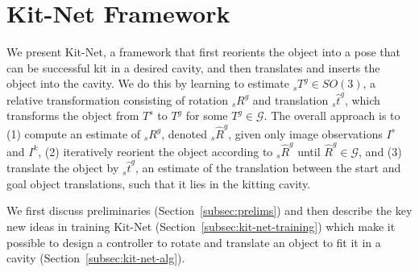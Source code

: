 \section{Kit-Net Framework}
\label{sec:method}
We present Kit-Net, a framework that first reorients the object into a pose that can be successful kit in a desired cavity, and then translates and inserts the object into the cavity. We do this by learning to estimate ${_s}T^g \in SO(3)$, a relative transformation consisting of rotation ${_s}R^g$ and translation ${_s}\hat{t}^g$, which transforms the object from $T^s$ to $T^g$ for some $T^g \in \mathcal{G}$. The overall approach is to (1) compute an estimate of ${_s}R^g$, denoted ${_s}\hat{R}^g$, given only image observations $I^s$ and $I^k$, (2) iteratively reorient the object according to  ${_s}\hat{R}^g$ until $\hat{R}^g \in \mathcal{G}$, and (3) translate the object by ${_s}\hat{t}^g$, an estimate of the translation between the start and goal object translations, such that it lies in the kitting cavity.

We first discuss preliminaries (Section~\ref{subsec:prelims}) and then describe the key new ideas in training Kit-Net (Section~\ref{subsec:kit-net-training}) which make it possible to design a controller to rotate and translate an object to fit it in a cavity (Section~\ref{subsec:kit-net-alg}).

